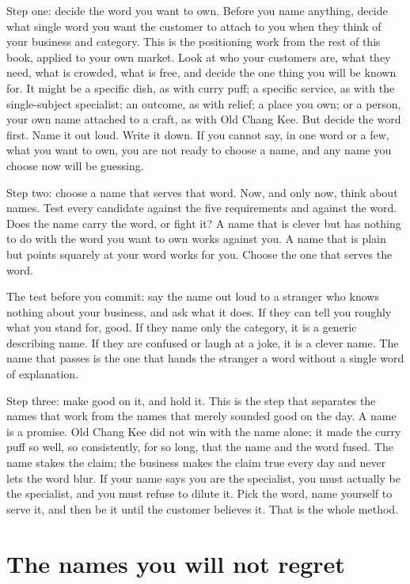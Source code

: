 \documentclass[10pt,twoside,openany]{memoir}
\newcommand{\needspacehead}{\needspace{4\baselineskip}}
\let\oldsection\section
\renewcommand{\section}{\needspacehead\oldsection}
\begin{document}
{Step one: decide the word you want to own. Before you name anything,
decide what single word you want the customer to attach to you when they
think of your business and category. This is the positioning work from
the rest of this book, applied to your own market. Look at who your
customers are, what they need, what is crowded, what is free, and decide
the one thing you will be known for. It might be a specific dish, as
with curry puff; a specific service, as with the single-subject
specialist; an outcome, as with relief; a place you own; or a person,
your own name attached to a craft, as with Old Chang Kee. But decide the
word first. Name it out loud. Write it down. If you cannot say, in one
word or a few, what you want to own, you are not ready to choose a name,
and any name you choose now will be guessing.

Step two: choose a name that serves that word. Now, and only now, think
about names. Test every candidate against the five requirements and
against the word. Does the name carry the word, or fight it? A name that
is clever but has nothing to do with the word you want to own works
against you. A name that is plain but points squarely at your word works
for you. Choose the one that serves the word.

The test before you commit: say the name out loud to a stranger who
knows nothing about your business, and ask what it does. If they can
tell you roughly what you stand for, good. If they name only the
category, it is a generic describing name. If they are confused or laugh
at a joke, it is a clever name. The name that passes is the one that
hands the stranger a word without a single word of explanation.

Step three: make good on it, and hold it. This is the step that
separates the names that work from the names that merely sounded good on
the day. A name is a promise. Old Chang Kee did not win with the name
alone; it made the curry puff so well, so consistently, for so long,
that the name and the word fused. The name stakes the claim; the
business makes the claim true every day and never lets the word blur. If
your name says you are the specialist, you must actually be the
specialist, and you must refuse to dilute it. Pick the word, name
yourself to serve it, and then be it until the customer believes it.
That is the whole method.

\section{The names you will not
regret}\label{the-names-you-will-not-regret}

}
\end{document}
